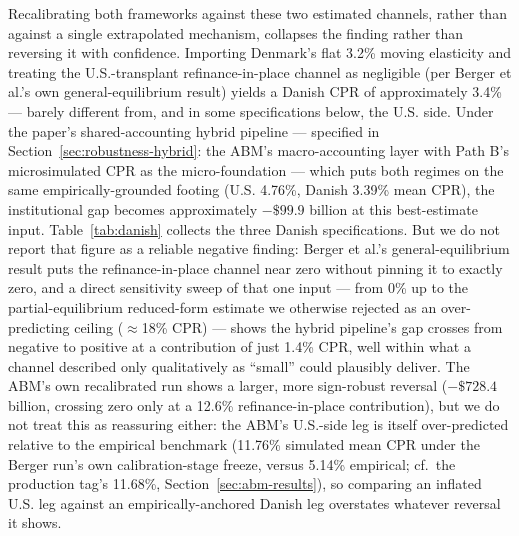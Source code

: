 \documentclass[12pt]{article}
\begin{document}
Recalibrating both frameworks against these two estimated channels, rather than against a single extrapolated mechanism, collapses the finding rather than reversing it with confidence. Importing Denmark's flat 3.2\% moving elasticity and treating the U.S.-transplant refinance-in-place channel as negligible (per Berger et al.'s own general-equilibrium result) yields a Danish CPR of approximately 3.4\% --- barely different from, and in some specifications below, the U.S. side. Under the paper's shared-accounting hybrid pipeline --- specified in Section~\ref{sec:robustness-hybrid}: the ABM's macro-accounting layer with Path B's microsimulated CPR as the micro-foundation --- which puts both regimes on the same empirically-grounded footing (U.S. 4.76\%, Danish 3.39\% mean CPR), the institutional gap becomes approximately $-\$99.9$ billion at this best-estimate input. Table~\ref{tab:danish} collects the three Danish specifications. But we do not report that figure as a reliable negative finding: Berger et al.'s general-equilibrium result puts the refinance-in-place channel near zero without pinning it to exactly zero, and a direct sensitivity sweep of that one input --- from 0\% up to the partial-equilibrium reduced-form estimate we otherwise rejected as an over-predicting ceiling ($\approx$18\% CPR) --- shows the hybrid pipeline's gap crosses from negative to positive at a contribution of just 1.4\% CPR, well within what a channel described only qualitatively as ``small'' could plausibly deliver. The ABM's own recalibrated run shows a larger, more sign-robust reversal ($-\$728.4$ billion, crossing zero only at a 12.6\% refinance-in-place contribution), but we do not treat this as reassuring either: the ABM's U.S.-side leg is itself over-predicted relative to the empirical benchmark (11.76\% simulated mean CPR under the Berger run's own calibration-stage freeze, versus 5.14\% empirical; cf.\ the production tag's 11.68\%, Section~\ref{sec:abm-results}), so comparing an inflated U.S. leg against an empirically-anchored Danish leg overstates whatever reversal it shows.
\end{document}
